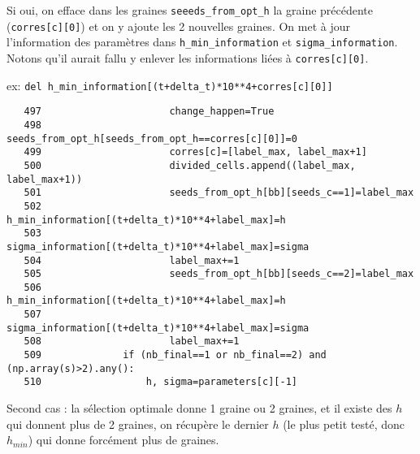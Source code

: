 \documentclass{article}
\def \mycolor {red}
\begin{document}
Si oui, on efface dans les graines  \verb|seeeds_from_opt_h| la graine pr\'ec\'edente (\verb|corres[c][0]|) et on y ajoute les 2 nouvelles graines. On met \`a jour l'information des param\`etres dans \verb|h_min_information| et \verb|sigma_information|. Notons qu'il aurait fallu y enlever les informations li\'ees \`a \verb|corres[c][0]|.

ex: \verb|del h_min_information[(t+delta_t)*10**4+corres[c][0]]|

\color{black}
\begin{verbatim} 
   497	                    change_happen=True
   498	                    seeds_from_opt_h[seeds_from_opt_h==corres[c][0]]=0
   499	                    corres[c]=[label_max, label_max+1]
   500	                    divided_cells.append((label_max, label_max+1))
   501	                    seeds_from_opt_h[bb][seeds_c==1]=label_max
   502	                    h_min_information[(t+delta_t)*10**4+label_max]=h
   503	                    sigma_information[(t+delta_t)*10**4+label_max]=sigma
   504	                    label_max+=1
   505	                    seeds_from_opt_h[bb][seeds_c==2]=label_max
   506	                    h_min_information[(t+delta_t)*10**4+label_max]=h
   507	                    sigma_information[(t+delta_t)*10**4+label_max]=sigma
   508	                    label_max+=1
   509	            if (nb_final==1 or nb_final==2) and (np.array(s)>2).any():
   510	                h, sigma=parameters[c][-1]
\end{verbatim} 
\color{\mycolor}
Second cas : la s\'election optimale donne 1 graine ou 2 graines, et il existe des $h$ qui donnent plus de 2 graines, on r\'ecup\`ere le dernier $h$ (le plus petit test\'e, donc $h_{min}$) qui donne forc\'ement plus de graines. 
\end{document}
